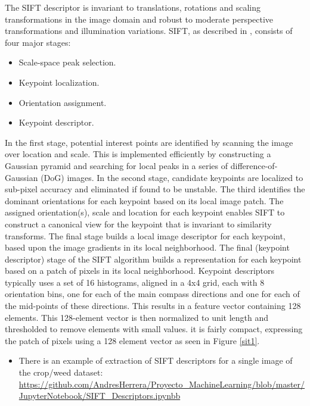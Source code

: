 \documentclass[12pt]{article}
\numberwithin{equation}{section}
\numberwithin{table}{section}
\numberwithin{figure}{section}
\begin{document}
\noindent
The SIFT descriptor is invariant to translations, rotations and scaling transformations in the image domain and robust to moderate perspective transformations and illumination variations.
\noindent
SIFT, as described in \cite{Ke2003}, consists of four major stages:

\begin{itemize}
	\item Scale-space peak selection.
	\item Keypoint localization.
	\item Orientation assignment.
	\item Keypoint descriptor.
\end{itemize}

\noindent
In the first stage, potential interest points are identified by scanning the image over location and scale. This is implemented efficiently by constructing a Gaussian pyramid and searching for local peaks in a series of difference-of-Gaussian (DoG) images. In the second stage, candidate keypoints are localized to sub-pixel accuracy and eliminated if found to be unstable. The third identifies the dominant orientations for each keypoint based on its local image patch. The assigned orientation(s), scale and location for each keypoint enables SIFT to construct a canonical view for the keypoint that is invariant to similarity transforms. The final stage builds a local image descriptor for each keypoint, based upon the image gradients in its local neighborhood. The final (keypoint descriptor) stage of the SIFT algorithm builds a representation for each keypoint based on a patch of pixels in its local neighborhood. Keypoint descriptors typically uses a set of 16 histograms, aligned in a 4x4 grid, each with 8 orientation bins, one for each of the main compass directions and one for each of the mid-points of these directions. This results in a feature vector containing 128 elements. This 128-element vector is then normalized to unit length and thresholded to remove elements with small values.  it is fairly compact, expressing the patch of pixels using a 128 element vector as seen in Figure \ref{sit1}.

\begin{itemize}
	\item {{There is an example of extraction of SIFT descriptors for a single image of the crop/weed dataset:} } \url{https://github.com/AndresHerrera/Proyecto_MachineLearning/blob/master/JupyterNotebook/SIFT_Descriptors.ipynbb}
\end{itemize}
\end{document}
